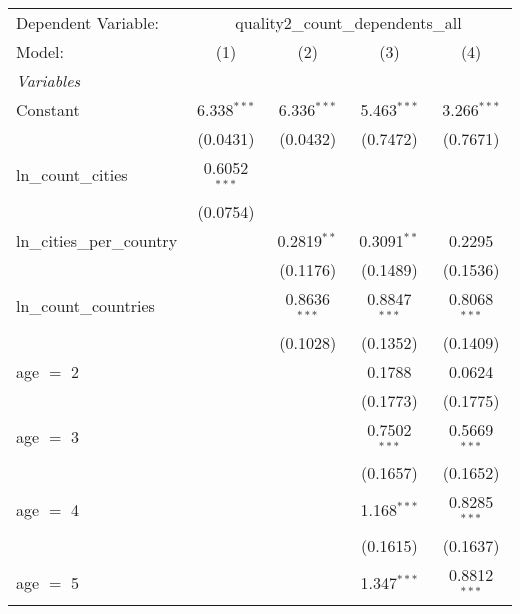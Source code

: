 \begingroup
\centering
\begin{tabular}{lcccc}
   \tabularnewline \midrule \midrule
   Dependent Variable: & \multicolumn{4}{c}{quality2\_count\_dependents\_all}\\
   Model:                               & (1)            & (2)            & (3)            & (4)\\  
   \midrule
   \emph{Variables}\\
   Constant                             & 6.338$^{***}$  & 6.336$^{***}$  & 5.463$^{***}$  & 3.266$^{***}$\\   
                                        & (0.0431)       & (0.0432)       & (0.7472)       & (0.7671)\\   
   ln\_count\_cities                    & 0.6052$^{***}$ &                &                &   \\   
                                        & (0.0754)       &                &                &   \\   
   ln\_cities\_per\_country             &                & 0.2819$^{**}$  & 0.3091$^{**}$  & 0.2295\\   
                                        &                & (0.1176)       & (0.1489)       & (0.1536)\\   
   ln\_count\_countries                 &                & 0.8636$^{***}$ & 0.8847$^{***}$ & 0.8068$^{***}$\\   
                                        &                & (0.1028)       & (0.1352)       & (0.1409)\\   
   age $=$ 2                            &                &                & 0.1788         & 0.0624\\   
                                        &                &                & (0.1773)       & (0.1775)\\   
   age $=$ 3                            &                &                & 0.7502$^{***}$ & 0.5669$^{***}$\\   
                                        &                &                & (0.1657)       & (0.1652)\\   
   age $=$ 4                            &                &                & 1.168$^{***}$  & 0.8285$^{***}$\\   
                                        &                &                & (0.1615)       & (0.1637)\\   
   age $=$ 5                            &                &                & 1.347$^{***}$  & 0.8812$^{***}$\\   

\end{tabular}
